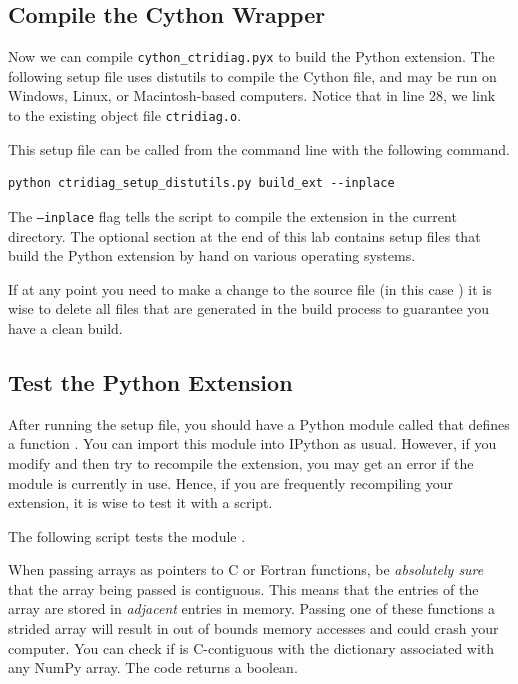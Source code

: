 \subsection*{Compile the Cython Wrapper}

Now we can compile \texttt{cython\_ctridiag.pyx} to build the Python extension.
The following setup file uses distutils to compile the Cython file, and may be run on Windows, Linux, or Macintosh-based computers.
Notice that in line 28, we link to the existing object file \texttt{ctridiag.o}.



This setup file can be called from the command line with the following command.
\begin{lstlisting}[style=ShellInput]
python ctridiag_setup_distutils.py build_ext --inplace
\end{lstlisting}
The \texttt{--inplace} flag tells the script to compile the extension in the current directory.
The optional section at the end of this lab contains setup files that build the Python extension by hand on various operating systems.

\begin{warn}
If at any point you need to make a change to the source file (in this case
) it is wise to delete all files that are generated in the
build process to guarantee you have a clean build.
\end{warn}

\subsection*{Test the Python Extension}
After running the setup file, you should have a Python module called  that defines a function .
You can import this module into IPython as usual.
However, if you modify  and then try to recompile the extension, you may get an error if the module is currently in use.
Hence, if you are frequently recompiling your extension, it is wise to test it  with a script.

The following script tests the module .



\begin{warn}
When passing arrays as pointers to C or Fortran functions, be \emph{absolutely sure} that the array being passed is contiguous.
This means that the entries of the array are stored in \emph{adjacent} entries in memory.
Passing one of these functions a strided array will result in out of bounds memory accesses and could crash your computer.
You can check if  is C-contiguous with the  dictionary associated with any NumPy array. The code  returns a boolean.
\end{warn}

